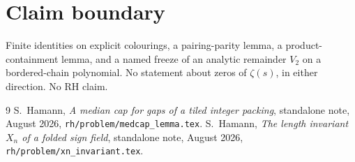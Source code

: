 \documentclass[11pt]{article}
\theoremstyle{remark}
\begin{document}
\section*{Claim boundary}

Finite identities on explicit colourings, a pairing-parity lemma,
a product-containment lemma, and a named freeze of an analytic
remainder $V_2$ on a bordered-chain polynomial.  No statement
about zeros of $\zeta(s)$, in either direction.  No RH claim.

\begin{thebibliography}{9}
S.~Hamann,
\textit{A median cap for gaps of a tiled integer packing},
standalone note, August 2026,
\texttt{rh/problem/medcap\_lemma.tex}.
S.~Hamann,
\textit{The length invariant $X_n$ of a folded sign field},
standalone note, August 2026,
\texttt{rh/problem/xn\_invariant.tex}.
\end{thebibliography}
\end{document}
